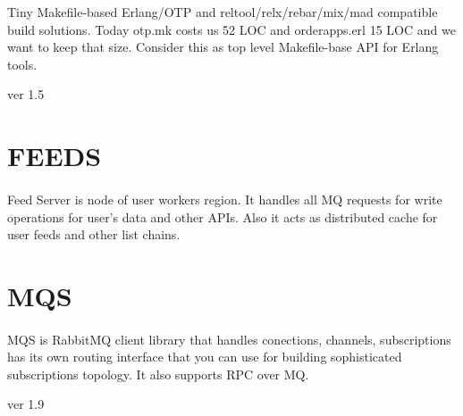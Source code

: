 \documentclass[11pt]{article}
\begin{document}
Tiny Makefile-based Erlang/OTP and reltool/relx/rebar/mix/mad compatible
build solutions. Today otp.mk costs us 52 LOC and orderapps.erl 15 LOC
and we want to keep that size. Consider this as top level Makefile-base
API for Erlang tools.

 ver 1.5

\section*{FEEDS}
\paragraph{}
Feed Server is node of user workers region. It handles all MQ
requests for write operations for user's data and other APIs.
Also it acts as distributed cache for user feeds and other list chains.



\section*{MQS}
\paragraph{}
MQS is RabbitMQ client library that handles conections, channels,
subscriptions has its own routing interface that you can use for building
sophisticated subscriptions topology. It also supports RPC over MQ.

 ver 1.9





\vspace{1cm}
\end{document}
